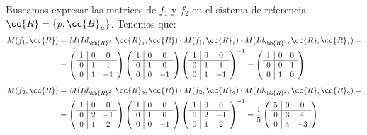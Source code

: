 \begin{ejercicio}
    Buscamos expresar las matrices de $f_1$ y $f_2$ en el sistema de referencia $\cc{R} = \{p, \cc{B}_u\}$.
    Tenemos que:
    \begin{align*}
        M(f_1,\cc{R}) &= M(Id_{\bb{R}^2},\cc{R}_1,\cc{R})\cdot M(f_1,\cc{R}_1) \cdot M(Id_{\bb{R}^2},\cc{R},\cc{R}_1) =\\
        &= \left(\begin{array}{c|cc}
            1 & 0 & 0 \\ \hline
            0 & 1 & 1 \\
            0 & 1 & -1
        \end{array}\right)
        \left(\begin{array}{c|cc}
            1 & 0 & 0 \\ \hline
            0 & 1 & 0 \\
            0 & 0 & -1
        \end{array}\right)
        \left(\begin{array}{c|cc}
            1 & 0 & 0 \\ \hline
            0 & 1 & 1 \\
            0 & 1 & -1
        \end{array}\right)^{-1}
        = \left(\begin{array}{c|cc}
            1 & 0 & 0 \\ \hline
            0 & 0 & 1 \\
            0 & 1 & 0
        \end{array}\right)
    \end{align*}
    \begin{align*}
        M(f_2,\cc{R}) &= M(Id_{\bb{R}^2},\cc{R}_2,\cc{R})\cdot M(f_2,\cc{R}_2) \cdot M(Id_{\bb{R}^2},\cc{R},\cc{R}_2) =\\
        &= \left(\begin{array}{c|cc}
            1 & 0 & 0 \\ \hline
            0 & 2 & -1 \\
            0 & 1 & 2
        \end{array}\right)
        \left(\begin{array}{c|cc}
            1 & 0 & 0 \\ \hline
            0 & 1 & 0 \\
            0 & 0 & -1
        \end{array}\right)
        \left(\begin{array}{c|cc}
            1 & 0 & 0 \\ \hline
            0 & 2 & -1 \\
            0 & 1 & 2
        \end{array}\right)^{-1}
        = \frac{1}{5}\left(\begin{array}{c|cc}
            5 & 0 & 0 \\ \hline
            0 & 3 & 4 \\
            0 & 4 & -3
        \end{array}\right)
    \end{align*}


\end{ejercicio}
